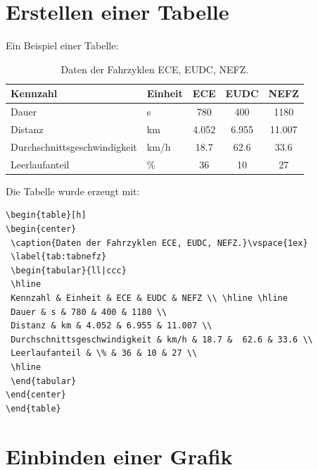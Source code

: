 \section{Erstellen einer Tabelle}\label{sec:tabellen}

Ein Beispiel einer Tabelle:
\begin{table}[h]
\begin{center}
 \caption{Daten der Fahrzyklen ECE, EUDC, NEFZ.}\vspace{1ex}
 \label{tab:tabnefz}
 \begin{tabular}{ll|ccc}
 \hline
 Kennzahl & Einheit & ECE & EUDC & NEFZ \\ \hline \hline
 Dauer & s & 780 & 400 & 1180 \\
 Distanz & km & 4.052 & 6.955 & 11.007 \\
 Durchschnittsgeschwindigkeit & km/h & 18.7 &  62.6 & 33.6 \\
 Leerlaufanteil & \% & 36 & 10 & 27 \\
 \hline
 \end{tabular}
\end{center}
\end{table}

Die Tabelle wurde erzeugt mit:
\begin{verbatim}
\begin{table}[h]
\begin{center}
 \caption{Daten der Fahrzyklen ECE, EUDC, NEFZ.}\vspace{1ex}
 \label{tab:tabnefz}
 \begin{tabular}{ll|ccc}
 \hline
 Kennzahl & Einheit & ECE & EUDC & NEFZ \\ \hline \hline
 Dauer & s & 780 & 400 & 1180 \\
 Distanz & km & 4.052 & 6.955 & 11.007 \\
 Durchschnittsgeschwindigkeit & km/h & 18.7 &  62.6 & 33.6 \\
 Leerlaufanteil & \% & 36 & 10 & 27 \\
 \hline
 \end{tabular}
\end{center}
\end{table}
\end{verbatim}


\section{Einbinden einer Grafik}\label{sec:epsgraph}

